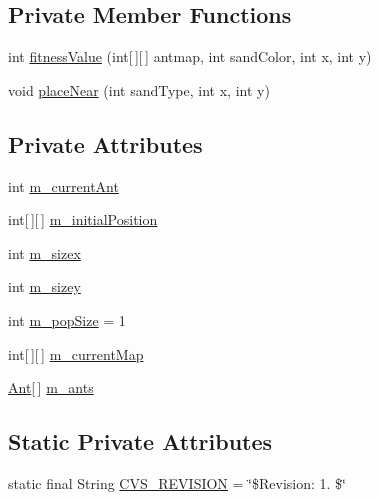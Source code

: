 \subsection*{Private Member Functions}
\begin{DoxyCompactItemize}
\item 
int \hyperlink{classexamples_1_1gp_1_1painted_desert_1_1_ant_map_a4214fe244286172023cdfbec6b4145b2}{fitness\-Value} (int\mbox{[}$\,$\mbox{]}\mbox{[}$\,$\mbox{]} antmap, int sand\-Color, int x, int y)
\item 
void \hyperlink{classexamples_1_1gp_1_1painted_desert_1_1_ant_map_af7e2859a55023a63b50e9fd3079fc6ba}{place\-Near} (int sand\-Type, int x, int y)
\end{DoxyCompactItemize}
\subsection*{Private Attributes}
\begin{DoxyCompactItemize}
\item 
int \hyperlink{classexamples_1_1gp_1_1painted_desert_1_1_ant_map_a63111b71122dd708446f8145e6008b26}{m\-\_\-current\-Ant}
\item 
int\mbox{[}$\,$\mbox{]}\mbox{[}$\,$\mbox{]} \hyperlink{classexamples_1_1gp_1_1painted_desert_1_1_ant_map_a289ec5e8a730110d962f03c360ea3041}{m\-\_\-initial\-Position}
\item 
int \hyperlink{classexamples_1_1gp_1_1painted_desert_1_1_ant_map_a016b600ade182674d82cedec8742ce8b}{m\-\_\-sizex}
\item 
int \hyperlink{classexamples_1_1gp_1_1painted_desert_1_1_ant_map_a35b5883a121b1ae1301a39b9cf185fd3}{m\-\_\-sizey}
\item 
int \hyperlink{classexamples_1_1gp_1_1painted_desert_1_1_ant_map_a439ba6a19eee3c4f59c95e80dc2cede7}{m\-\_\-pop\-Size} = 1
\item 
int\mbox{[}$\,$\mbox{]}\mbox{[}$\,$\mbox{]} \hyperlink{classexamples_1_1gp_1_1painted_desert_1_1_ant_map_a3d0989db01dd310b39ff9f9749818465}{m\-\_\-current\-Map}
\item 
\hyperlink{classexamples_1_1gp_1_1painted_desert_1_1_ant}{Ant}\mbox{[}$\,$\mbox{]} \hyperlink{classexamples_1_1gp_1_1painted_desert_1_1_ant_map_a57d23d277ed6f9ae95e8bf0d909bcdcd}{m\-\_\-ants}
\end{DoxyCompactItemize}
\subsection*{Static Private Attributes}
\begin{DoxyCompactItemize}
\item 
static final String \hyperlink{classexamples_1_1gp_1_1painted_desert_1_1_ant_map_ab67ca8f36fdf6039656fe215f4c358e3}{C\-V\-S\-\_\-\-R\-E\-V\-I\-S\-I\-O\-N} = \char`\"{}\$Revision\-: 1. \$\char`\"{}
\end{DoxyCompactItemize}


